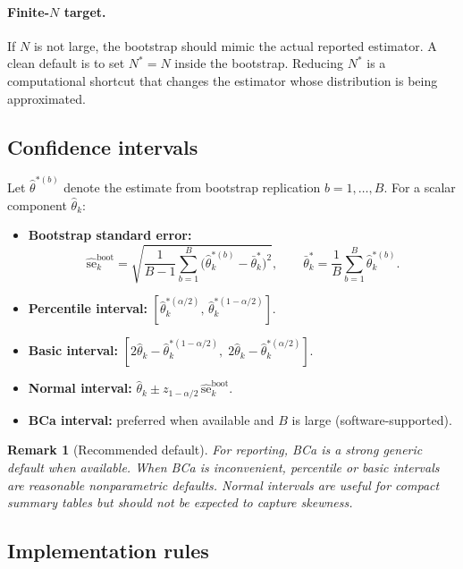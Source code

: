 \documentclass[11pt]{article}
\newtheorem{remark}{Remark}
\begin{document}
\paragraph{Finite-$N$ target.}
If $N$ is not large, the bootstrap should mimic the actual reported estimator.
A clean default is to set $N^*=N$ inside the bootstrap. Reducing $N^*$ is a
computational shortcut that changes the estimator whose distribution is being
approximated.

\subsection{Confidence intervals}

Let $\hat\theta^{*(b)}$ denote the estimate from bootstrap replication
$b=1,\ldots,B$. For a scalar component $\hat\theta_k$:

\begin{itemize}
  \item \textbf{Bootstrap standard error:}
  \[
  \widehat{\mathrm{se}}^{\mathrm{boot}}_k
  = \sqrt{\frac{1}{B-1}\sum_{b=1}^B\bigl(\hat\theta_k^{*(b)}-\bar\theta_k^*\bigr)^2},
  \qquad \bar\theta_k^*=\frac{1}{B}\sum_{b=1}^B\hat\theta_k^{*(b)}.
  \]

  \item \textbf{Percentile interval:}
  $[\hat\theta_k^{*(\alpha/2)},\,\hat\theta_k^{*(1-\alpha/2)}]$.

  \item \textbf{Basic interval:}
  $[2\hat\theta_k-\hat\theta_k^{*(1-\alpha/2)},\;2\hat\theta_k-\hat\theta_k^{*(\alpha/2)}]$.

  \item \textbf{Normal interval:}
  $\hat\theta_k \pm z_{1-\alpha/2}\,\widehat{\mathrm{se}}^{\mathrm{boot}}_k$.

  \item \textbf{BCa interval:}
  preferred when available and $B$ is large (software-supported).
\end{itemize}

\begin{remark}[Recommended default]
For reporting, BCa is a strong generic default when available.
When BCa is inconvenient, percentile or basic intervals are reasonable
nonparametric defaults. Normal intervals are useful for compact summary tables
but should not be expected to capture skewness.
\end{remark}

\subsection{Implementation rules}
\end{document}
